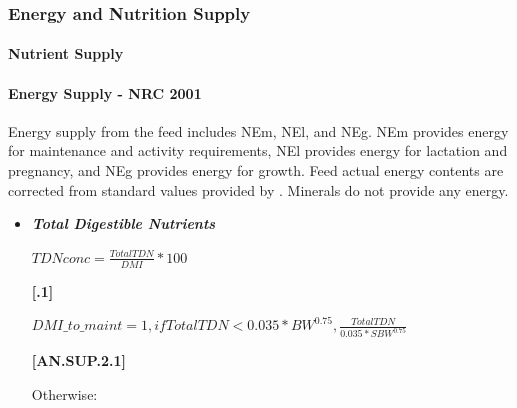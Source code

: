 \documentclass{article}
\begin{document}
\begin{refsection}
\subsubsection{Energy and Nutrition Supply }\label{sec:nutsupply}
\vspace{0.25cm}

\paragraph{Nutrient Supply}

\paragraph{Energy Supply - NRC 2001}
\vspace{0.2cm}

 Energy supply from the feed includes NEm, NEl, and NEg. NEm provides energy for maintenance and activity requirements, NEl provides energy for lactation and pregnancy, and NEg provides energy for growth. Feed actual energy contents are corrected from standard values provided by \textcite{nrc2001}. Minerals do not provide any energy.
    \vspace{0.2cm}

    \begin{itemize}
    \item \textbf{\textit{Total Digestible Nutrients}} 
    \vspace{0.25cm}

    \begin{center}
    \(TDNconc = \frac{TotalTDN}{DMI} * 100\)
    \end{center}
    \vspace{0.5cm}
    
            {\raggedleft \textbf{[.1]}\par}
            \vspace{0.5cm}

    \begin{center}
    \(DMI\_to\_maint = 1, if TotalTDN < 0.035 * BW^{0.75}, \frac{TotalTDN}{0.035*SBW^{0.75}}\)
    \end{center}
    \vspace{0.5cm}
    
            {\raggedleft \textbf{[AN.SUP.2.1]}\par}
            \vspace{0.5cm}

    Otherwise: 
    \vspace{0.1cm}
    

\end{itemize}
\end{refsection}
\end{document}
